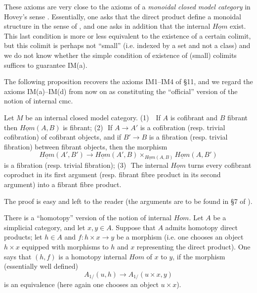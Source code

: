 These axioms are very close to the axioms of a {\em monoidal closed model
category} in Hovey's sense \cite{HoveyMonMod}. Essentially, one asks that the
direct product define a monoidal structure in the sense of
\cite{HoveyMonMod}, and one asks in addition that the internal $\underline{Hom}$
exist. This last condition is more or less equivalent to the existence of a
certain colimit, but this colimit is perhaps not ``small'' (i.e. indexed by a
set and not a class) and we do not know whether the simple condition of
existence of (small) colimits suffices to guarantee IM(a).

The following proposition recovers the axioms IM1--IM4 of \cite{nCAT} \S 11,
and we regard the axioms IM(a)--IM(d) from now on as constituting the
``official'' version of the notion of internal cmc.

\begin{proposition}
\label{interne}
Let $M$ be an internal closed model category.
\newline
(1) \,\, If $A$ is cofibrant and $B$ fibrant then $\underline{Hom}(A,B)$ is
fibrant; \newline
(2)\,\, If $A\rightarrow A'$ is a cofibration (resp. trivial cofibration) of
cofibrant objects, and if $B'\rightarrow B$ is a fibration (resp. trivial
fibration) between fibrant objects, then the morphism
$$
\underline{Hom}(A',B')\rightarrow
\underline{Hom}(A',B) \times _{\underline{Hom}(A,B) }\underline{Hom}(A,B')
$$
is a fibration (resp. trivial fibration);
\newline
(3)\,\, The internal $\underline{Hom}$ turns every cofibrant coproduct in its
first argument (resp. fibrant fibre product in its second argument) into a
fibrant fibre product.
\end{proposition}
The proof is easy and left to the reader (the arguments are to be found in \S 7
of \cite{nCAT}).
\eop

There is a ``homotopy'' version of the notion of internal $Hom$. Let $A$ be a
simplicial category, and let $x,y\in A$. Suppose that $A$ admits homotopy
direct products; let $h\in A$ and $f: h\times x\rightarrow y$ be a morphism
(i.e. one chooses an object $h\times x$ equipped with morphisms to $h$ and $x$
representing the direct product). One says that $(h,f)$ is a homotopy internal
$Hom$ of $x$ to $y$, if the morphism (essentially well defined)
$$
A_{1/}(u,h)\rightarrow A_{1/}(u\times x, y)
$$
is an equivalence (here again one chooses an object $u\times x$).

